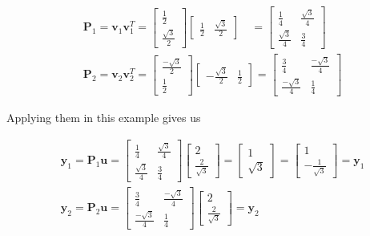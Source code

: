 \documentclass[main.tex]{subfiles}
\begin{document}
$$
\begin{aligned}
&\mathbf{P}_{1}=\mathbf{v}_{1} \mathbf{v}_{1}^{T}=\left[\begin{array}{c}
\frac{1}{2} \\
\frac{\sqrt{3}}{2}
\end{array}\right]\left[\begin{array}{ll}
\frac{1}{2} & \frac{\sqrt{3}}{2}
\end{array}\right] \quad=\left[\begin{array}{cc}
\frac{1}{4} & \frac{\sqrt{3}}{4} \\
\frac{\sqrt{3}}{4} & \frac{3}{4}
\end{array}\right] \\
&\mathbf{P}_{2}=\mathbf{v}_{2} \mathbf{v}_{2}^{T}=\left[\begin{array}{c}
\frac{-\sqrt{3}}{2} \\
\frac{1}{2}
\end{array}\right]\left[\begin{array}{ll}
-\frac{\sqrt{3}}{2} & \frac{1}{2}
\end{array}\right]=\left[\begin{array}{cc}
\frac{3}{4} & \frac{-\sqrt{3}}{4} \\
\frac{-\sqrt{3}}{4} & \frac{1}{4}
\end{array}\right]
\end{aligned}
$$

Applying them in this example gives us

$$
\begin{aligned}
&\mathbf{y}_{1}=\mathbf{P}_{1} \mathbf{u}=\left[\begin{array}{cc}
\frac{1}{4} & \frac{\sqrt{3}}{4} \\
\frac{\sqrt{3}}{4} & \frac{3}{4}
\end{array}\right]\left[\begin{array}{c}
2 \\
\frac{2}{\sqrt{3}}
\end{array}\right]=\left[\begin{array}{r}
1 \\
\sqrt{3}
\end{array}\right]=\left[\begin{array}{c}
1 \\
-\frac{1}{\sqrt{3}}
\end{array}\right]=\mathbf{y}_{1} \\
&\mathbf{y}_{2}=\mathbf{P}_{2} \mathbf{u}=\left[\begin{array}{cc}
\frac{3}{4} & \frac{-\sqrt{3}}{4} \\
\frac{-\sqrt{3}}{4} & \frac{1}{4}
\end{array}\right]\left[\begin{array}{c}
2 \\
\frac{2}{\sqrt{3}}
\end{array}\right]=\mathbf{y}_{2}
\end{aligned}
$$
\end{document}
